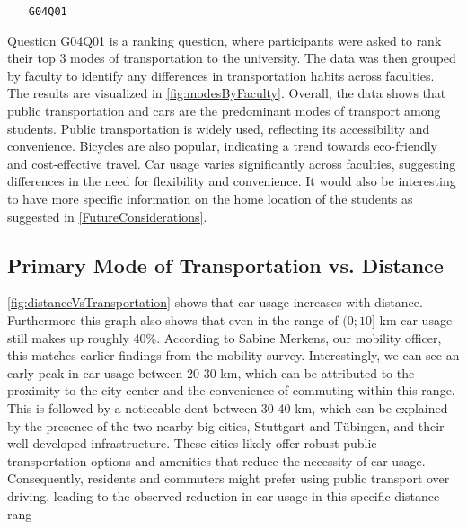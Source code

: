 \begin{enumerate}
    \item[\texttt{G04Q01}] 
\end{enumerate}
Question G04Q01 is a ranking question, where participants were asked to rank their top 3 modes of transportation to the university. The data was then grouped by faculty to identify any differences in transportation habits across faculties. The results are visualized in \ref{fig:modesByFaculty}.
Overall, the data shows that public transportation and cars are the predominant modes of transport among students. Public transportation is widely used, reflecting its accessibility and convenience. Bicycles are also popular, indicating a trend towards eco-friendly and cost-effective travel.
 Car usage varies significantly across faculties, suggesting differences in the need for flexibility and convenience. It would also be interesting to have more specific information on the home location of the students as suggested in \ref{FutureConsiderations}.
 

\subsection{Primary Mode of Transportation vs. Distance}

\ref{fig:distanceVsTransportation} shows that car usage increases with distance. Furthermore this graph also shows that even in the range of $(0;10]$ km car usage still makes up roughly 40\%. According to Sabine Merkens, our mobility officer, this matches earlier findings from the mobility survey. 
Interestingly, we can see an early peak in car usage between 20-30 km, which can be attributed to the proximity to the city center and the convenience of commuting within this range. This is followed by a noticeable dent between 30-40 km, which can be explained by the presence of the two nearby big cities, Stuttgart and Tübingen, and their well-developed infrastructure. These cities likely offer robust public transportation options and amenities that reduce the necessity of car usage. Consequently, residents and commuters might prefer using public transport over driving, leading to the observed reduction in car usage in this specific distance rang

